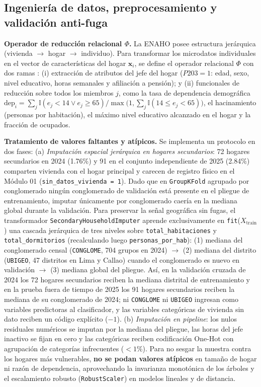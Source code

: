 \subsection{Ingeniería de datos, preprocesamiento y validación anti-fuga}

\textbf{Operador de reducción relacional $\Phi$.} La ENAHO posee estructura jerárquica (vivienda $\rightarrow$ hogar $\rightarrow$ individuo). Para transformar los microdatos individuales en el vector de características del hogar $\mathbf{x}_i$, se define el operador relacional $\Phi$ con dos ramas \cite{grosh2022revisiting}: (i) extracción de atributos del jefe del hogar ($P203 = 1$: edad, sexo, nivel educativo, horas semanales y afiliación a pensión); y (ii) funcionales de reducción sobre todos los miembros $j$, como la tasa de dependencia demográfica $\text{dep}_i = \sum_j \mathbb{I}(e_j<14 \lor e_j \ge 65) / \max\bigl(1, \sum_j \mathbb{I}(14 \le e_j < 65)\bigr)$, el hacinamiento (personas por habitación), el máximo nivel educativo alcanzado en el hogar y la fracción de ocupados.

\textbf{Tratamiento de valores faltantes y atípicos.} Se implementa un protocolo en dos fases: (a) \textit{Imputación espacial jerárquica en hogares secundarios}: 72 hogares secundarios en 2024 (1.76\%) y 91 en el conjunto independiente de 2025 (2.84\%) comparten vivienda con el hogar principal y carecen de registro físico en el Módulo 01 (\texttt{sin\_datos\_vivienda = 1}). Dado que en \texttt{GroupKFold} agrupado por conglomerado ningún conglomerado de validación está presente en el pliegue de entrenamiento, imputar únicamente por conglomerado caería en la mediana global durante la validación. Para preservar la señal geográfica sin fugas, el transformador \texttt{SecondaryHouseholdImputer} aprende exclusivamente en \texttt{fit}($X_{\text{train}}$) una cascada jerárquica de tres niveles sobre \texttt{total\_habitaciones} y \texttt{total\_dormitorios} (recalculando luego \texttt{personas\_por\_hab}): (1) mediana del conglomerado censal (\texttt{CONGLOME}, 704 grupos en 2024) $\rightarrow$ (2) mediana del distrito (\texttt{UBIGEO}, 47 distritos en Lima y Callao) cuando el conglomerado es nuevo en validación $\rightarrow$ (3) mediana global del pliegue. Así, en la validación cruzada de 2024 los 72 hogares secundarios reciben la mediana distrital de entrenamiento y en la prueba fuera de tiempo de 2025 los 91 hogares secundarios reciben la mediana de su conglomerado de 2024; ni \texttt{CONGLOME} ni \texttt{UBIGEO} ingresan como variables predictoras al clasificador, y las variables categóricas de vivienda sin dato reciben un código explícito ($-1$). (b) \textit{Imputación en pipeline}: los nulos residuales numéricos se imputan por la mediana del pliegue, las horas del jefe inactivo se fijan en cero y las categóricas reciben codificación One-Hot con agrupación de categorías infrecuentes ($<1\%$). Para no sesgar la muestra contra los hogares más vulnerables, \textbf{no se podan valores atípicos} en tamaño de hogar ni razón de dependencia, aprovechando la invarianza monotónica de los árboles y el escalamiento robusto (\texttt{RobustScaler}) en modelos lineales y de distancia.

